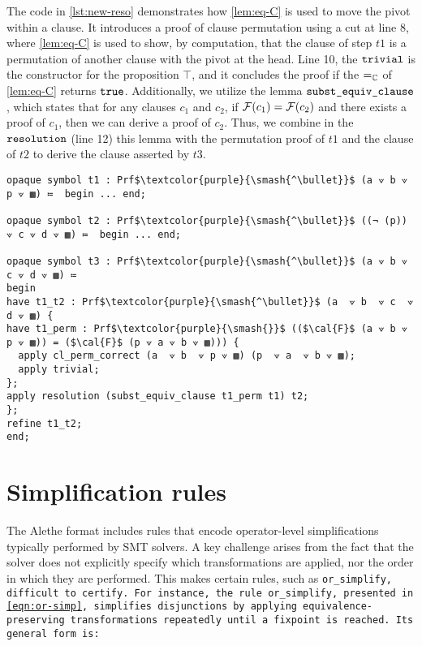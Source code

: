\begin{example}
The code in \cref{lst:new-reso} demonstrates how \cref{lem:eq-C} is used to move the pivot within a clause.
It introduces a proof of clause permutation using a cut at line 8, where \cref{lem:eq-C} is used to show, by computation, that the clause of step $t1$ is a permutation of another clause with the pivot at the head.
Line 10, the $\tt{trivial}$ is the constructor for the proposition $\top$, and it concludes the proof if the $=_{\bb{C}}$ of \cref{lem:eq-C} returns $\tt{true}$. %
Additionally, we utilize the lemma $\tt{subst\_equiv\_clause}$, which states that for any clauses $c_1$ and $c_2$, if $\cal{F}(c_1) = \cal{F}(c_2)$ and there exists a proof of $c_1$, then we can derive a proof of $c_2$.
Thus, we combine in the $\tt{resolution}$ (line 12) this lemma with the permutation proof of $t1$ and the clause of $t2$ to derive the clause asserted by $t3$.

\begin{lstlisting}[mathescape=true, caption={Reflective resolutions}, label={lst:new-reso}, language=Lambdapi]
opaque symbol t1 : Prf$\textcolor{purple}{\smash{^\bullet}}$ (a ⟇ b ⟇ p ⟇ ▩) ≔  begin ... end;

opaque symbol t2 : Prf$\textcolor{purple}{\smash{^\bullet}}$ ((¬ (p)) ⟇ c ⟇ d ⟇ ▩) ≔  begin ... end;

opaque symbol t3 : Prf$\textcolor{purple}{\smash{^\bullet}}$ (a ⟇ b ⟇ c ⟇ d ⟇ ▩) ≔ 
begin
have t1_t2 : Prf$\textcolor{purple}{\smash{^\bullet}}$ (a  ⟇ b  ⟇ c  ⟇ d ⟇ ▩) {
have t1_perm : Prf$\textcolor{purple}{\smash{}}$ (($\cal{F}$ (a ⟇ b ⟇ p ⟇ ▩)) = ($\cal{F}$ (p ⟇ a ⟇ b ⟇ ▩))) {
  apply cl_perm_correct (a  ⟇ b  ⟇ p ⟇ ▩) (p  ⟇ a  ⟇ b ⟇ ▩);
  apply trivial;
};
apply resolution (subst_equiv_clause t1_perm t1) t2;
};
refine t1_t2;
end;
\end{lstlisting}

\end{example}

\section{Simplification rules}

The Alethe format includes rules that encode operator-level simplifications typically performed by SMT solvers. 
A key challenge arises from the fact that the solver does not explicitly specify which transformations are applied, nor the order in which they are performed. This makes certain rules, such as \tt{or\_simplify}, difficult to certify. 
For instance, the rule \texttt{or\_simplify}, presented in \cref{eqn:or-simp}, simplifies disjunctions by applying equivalence-preserving transformations repeatedly until a fixpoint is reached. Its general form is:

